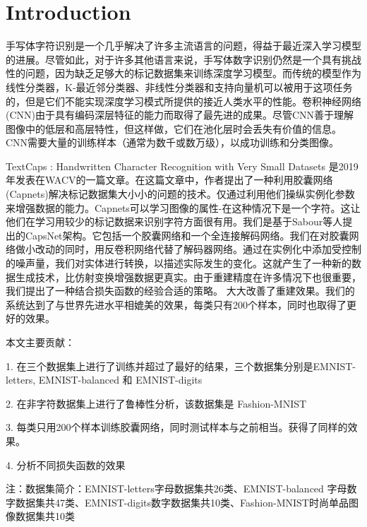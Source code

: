 \section{Introduction}
手写体字符识别是一个几乎解决了许多主流语言的问题，得益于最近深入学习模型的进展。尽管如此，对于许多其他语言来说，手写体数字识别仍然是一个具有挑战性的问题，因为缺乏足够大的标记数据集来训练深度学习模型。而传统的模型作为线性分类器，K-最近邻分类器、非线性分类器和支持向量机可以被用于这项任务的，但是它们不能实现深度学习模式所提供的接近人类水平的性能。卷积神经网络(CNN)由于具有编码深层特征的能力而取得了最先进的成果。尽管CNN善于理解图像中的低层和高层特性，但这样做，它们在池化层时会丢失有价值的信息。CNN需要大量的训练样本（通常为数千或数万级），以成功训练和分类图像。

TextCaps : Handwritten Character Recognition with Very Small Datasets \cite{jayasundara2019textcaps}是2019年发表在WACV的一篇文章。在这篇文章中，作者提出了一种利用胶囊网络(Capnets)\cite{sabour2017dynamic}解决标记数据集大小小的问题的技术。仅通过利用他们操纵实例化参数\cite{hinton2011transforming}来增强数据的能力。Capnets可以学习图像的属性-在这种情况下是一个字符。这让他们在学习用较少的标记数据来识别字符方面很有用。我们是基于Sabour等人提出的CapsNet架构。\cite{sabour2017dynamic}它包括一个胶囊网络和一个全连接解码网络。我们在对胶囊网络做小改动的同时，用反卷积网络代替了解码器网络。通过在实例化中添加受控制的噪声量，我们对实体进行转换，以描述实际发生的变化。这就产生了一种新的数据生成技术，比仿射变换增强数据更真实。由于重建精度在许多情况下也很重要，我们提出了一种结合损失函数的经验合适的策略。 大大改善了重建效果。我们的系统达到了与世界先进水平相媲美的效果，每类只有200个样本，同时也取得了更好的效果。

本文主要贡献：

1. 在三个数据集上进行了训练并超过了最好的结果，三个数据集分别是EMNIST-letters, EMNIST-balanced 和 EMNIST-digits

2. 在非字符数据集上进行了鲁棒性分析，该数据集是 Fashion-MNIST

3. 每类只用200个样本训练胶囊网络，同时测试样本与之前相当。获得了同样的效果。

4. 分析不同损失函数的效果

注：数据集简介：EMNIST-letters字母数据集共26类、EMNIST-balanced 字母数字数据集共47类、EMNIST-digits数字数据集共10类、Fashion-MNIST时尚单品图像数据集共10类

